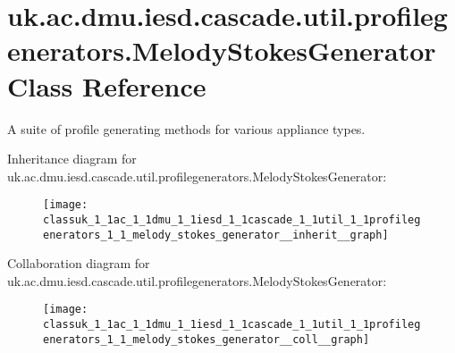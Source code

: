 \hypertarget{classuk_1_1ac_1_1dmu_1_1iesd_1_1cascade_1_1util_1_1profilegenerators_1_1_melody_stokes_generator}{\section{uk.\-ac.\-dmu.\-iesd.\-cascade.\-util.\-profilegenerators.\-Melody\-Stokes\-Generator Class Reference}
\label{classuk_1_1ac_1_1dmu_1_1iesd_1_1cascade_1_1util_1_1profilegenerators_1_1_melody_stokes_generator}
}


A suite of profile generating methods for various appliance types.  




Inheritance diagram for uk.\-ac.\-dmu.\-iesd.\-cascade.\-util.\-profilegenerators.\-Melody\-Stokes\-Generator\-:\nopagebreak
\begin{figure}[H]
\begin{center}
\leavevmode
\texttt{[image: classuk\_1\_1ac\_1\_1dmu\_1\_1iesd\_1\_1cascade\_1\_1util\_1\_1profilegenerators\_1\_1\_melody\_stokes\_generator\_\_inherit\_\_graph]}
\end{center}
\end{figure}


Collaboration diagram for uk.\-ac.\-dmu.\-iesd.\-cascade.\-util.\-profilegenerators.\-Melody\-Stokes\-Generator\-:\nopagebreak
\begin{figure}[H]
\begin{center}
\leavevmode
\texttt{[image: classuk\_1\_1ac\_1\_1dmu\_1\_1iesd\_1\_1cascade\_1\_1util\_1\_1profilegenerators\_1\_1\_melody\_stokes\_generator\_\_coll\_\_graph]}
\end{center}
\end{figure}
